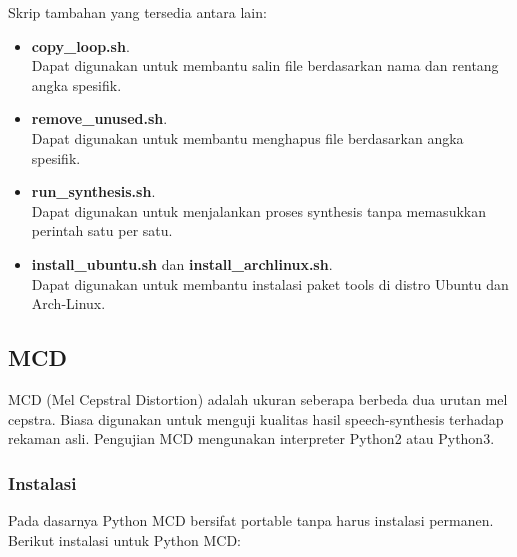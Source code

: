 \documentclass[12pt,]{article}
\begin{document}
	Skrip tambahan yang tersedia antara lain:
	\begin{itemize}
		\item \textbf{copy\_loop.sh}.\\
		Dapat digunakan untuk membantu salin file berdasarkan nama dan rentang angka spesifik.

		\item \textbf{remove\_unused.sh}.\\
		Dapat digunakan untuk membantu menghapus file berdasarkan angka spesifik.

		\item \textbf{run\_synthesis.sh}.\\
		Dapat digunakan untuk menjalankan proses synthesis tanpa memasukkan perintah satu per satu.

		\item \textbf{install\_ubuntu.sh} dan \textbf{install\_archlinux.sh}.\\
		Dapat digunakan untuk membantu instalasi paket tools di distro Ubuntu dan Arch-Linux.
	\end{itemize}

	\subsection{MCD}

	MCD (Mel Cepstral Distortion) adalah ukuran seberapa berbeda dua urutan mel cepstra.
	Biasa digunakan untuk menguji kualitas hasil speech-synthesis terhadap rekaman asli.
	Pengujian MCD mengunakan interpreter Python2 atau Python3.

	\subsubsection{Instalasi}

	Pada dasarnya Python MCD bersifat portable tanpa harus instalasi permanen.
	Berikut instalasi untuk Python MCD:
\end{document}
